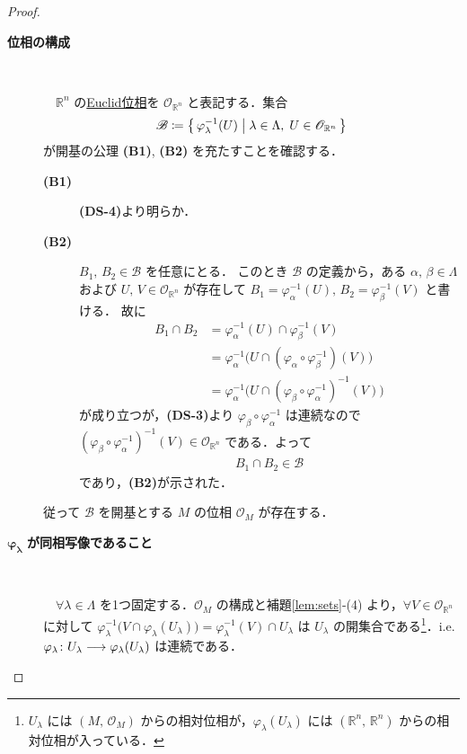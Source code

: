 \documentclass[TQFT_main]{subfiles}
\begin{document}
\begin{proof}
    \begin{description}
		\item[\textbf{位相の構成}]　
		
		　$\mathbb{R}^n$ の\hyperref[thm.metrictopo]{Euclid位相}を $\mathscr{O}_{\mathbb{R}^n}$ と表記する．集合
		\begin{align}
			\mathscr{B} \coloneqq \bigl\{\, \varphi_\lambda^{-1}(U) \bigm| \lambda \in \Lambda,\; U \in \mathscr{O}_{\mathbb{R}^n} \,\bigr\} 
		\end{align}
		が開基の公理 \textsf{\textbf{(B1)}}, \textsf{\textbf{(B2)}} を充たすことを確認する．
		\begin{description}
			\item[\textbf{(B1)}] \textsf{\textbf{(DS-4)}}より明らか．
			\item[\textbf{(B2)}] $B_1,\, B_2 \in \mathscr{B}$ を任意にとる．
			このとき $\mathscr{B}$ の定義から，ある $\alpha,\, \beta \in \Lambda$ および $U,\, V \in \mathscr{O}_{\mathbb{R}^n}$ が存在して $B_1 = \varphi_\alpha^{-1}(U),\, B_2 = \varphi_\beta^{-1}(V)$ と書ける．
			故に
			\begin{align}
				B_1 \cap B_2 &= \varphi_\alpha^{-1}(U) \cap \varphi_\beta^{-1}(V) \\
				&= \varphi_\alpha^{-1} \bigl( U \cap (\varphi_\alpha \circ \varphi_\beta^{-1})(V) \bigr) \\
				&= \varphi_\alpha^{-1} \bigl( U \cap (\varphi_\beta \circ \varphi_\alpha^{-1})^{-1}(V) \bigr)
			\end{align}
			が成り立つが，\textsf{\textbf{(DS-3)}}より $\varphi_\beta \circ \varphi_\alpha^{-1}$ は連続なので $(\varphi_\beta \circ \varphi_\alpha^{-1})^{-1}(V) \in \mathscr{O}_{\mathbb{R}^n}$ である．よって
			\begin{align}
				B_1 \cap B_2 \in \mathscr{B}
			\end{align}
			であり，\textsf{\textbf{(B2)}}が示された．
		\end{description}
		従って $\mathscr{B}$ を開基とする $M$ の位相 $\mathscr{O}_M$ が存在する．
		\item[$\bm{\varphi_\lambda}$ \textbf{が同相写像であること}]　
		
		　$\forall \lambda \in \Lambda$ を1つ固定する．$\mathscr{O}_M$ の構成と補題\ref{lem:sets}-(4) より，$\forall V \in \mathscr{O}_{\mathbb{R}^n}$ に対して
		$\varphi_\lambda^{-1}\bigl( V \cap \varphi_\lambda(U_\lambda) \bigr) = \varphi_\lambda^{-1}(V) \cap U_\lambda$ は $U_\lambda$ の開集合である\footnote{$U_\lambda$ には $(M,\,\mathscr{O}_M)$ からの相対位相が，$\varphi_\lambda(U_\lambda)$ には $(\mathbb{R}^n,\, \mathbb{R}^n)$ からの相対位相が入っている．}．i.e. $\varphi_\lambda \colon U_\lambda \longrightarrow \varphi_\lambda(U_\lambda)$ は連続である．
		

\end{description}
\end{proof}
\end{document}
